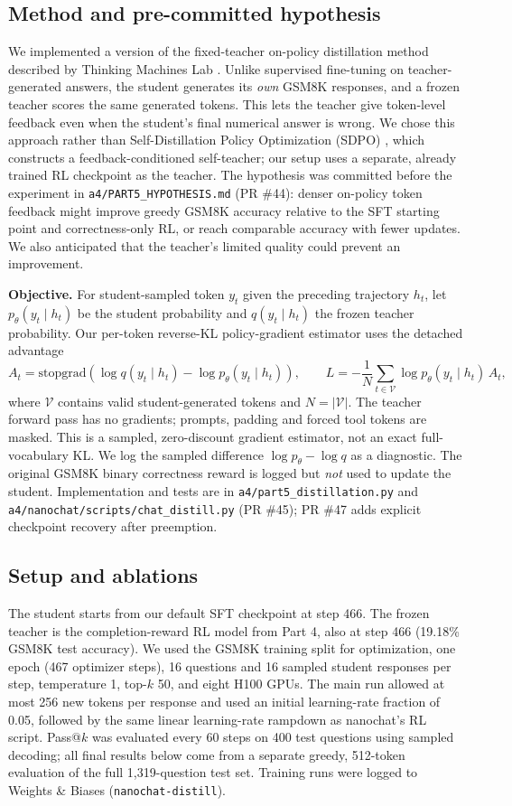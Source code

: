 \documentclass[10pt]{article}
\newcommand{\code}[1]{\texttt{#1}}
\begin{document}
\subsection*{Method and pre-committed hypothesis}
We implemented a version of the fixed-teacher on-policy distillation method described by Thinking Machines Lab \cite{onpolicydistill}. Unlike supervised fine-tuning on teacher-generated answers, the student generates its \emph{own} GSM8K responses, and a frozen teacher scores the same generated tokens. This lets the teacher give token-level feedback even when the student's final numerical answer is wrong. We chose this approach rather than Self-Distillation Policy Optimization (SDPO) \cite{sdpo}, which constructs a feedback-conditioned self-teacher; our setup uses a separate, already trained RL checkpoint as the teacher. The hypothesis was committed before the experiment in \code{a4/PART5\_HYPOTHESIS.md} (PR \#44): denser on-policy token feedback might improve greedy GSM8K accuracy relative to the SFT starting point and correctness-only RL, or reach comparable accuracy with fewer updates. We also anticipated that the teacher's limited quality could prevent an improvement.

\textbf{Objective.} For student-sampled token $y_t$ given the preceding trajectory $h_t$, let $p_\theta(y_t\mid h_t)$ be the student probability and $q(y_t\mid h_t)$ the frozen teacher probability. Our per-token reverse-KL policy-gradient estimator uses the detached advantage
\[
A_t=\mathrm{stopgrad}\!\left(\log q(y_t\mid h_t)-\log p_\theta(y_t\mid h_t)\right),
\qquad
L=-\frac{1}{N}\sum_{t\in\mathcal V}\log p_\theta(y_t\mid h_t)\,A_t,
\]
where $\mathcal V$ contains valid student-generated tokens and $N=|\mathcal V|$. The teacher forward pass has no gradients; prompts, padding and forced tool tokens are masked. This is a sampled, zero-discount gradient estimator, not an exact full-vocabulary KL. We log the sampled difference $\log p_\theta-\log q$ as a diagnostic. The original GSM8K binary correctness reward is logged but \emph{not} used to update the student. Implementation and tests are in \code{a4/part5\_distillation.py} and \code{a4/nanochat/scripts/chat\_distill.py} (PR \#45); PR \#47 adds explicit checkpoint recovery after preemption.

\subsection*{Setup and ablations}
The student starts from our default SFT checkpoint at step 466. The frozen teacher is the completion-reward RL model from Part 4, also at step 466 (19.18\% GSM8K test accuracy). We used the GSM8K training split for optimization, one epoch (467 optimizer steps), 16 questions and 16 sampled student responses per step, temperature 1, top-$k$ 50, and eight H100 GPUs. The main run allowed at most 256 new tokens per response and used an initial learning-rate fraction of 0.05, followed by the same linear learning-rate rampdown as nanochat's RL script. Pass@$k$ was evaluated every 60 steps on 400 test questions using sampled decoding; all final results below come from a separate greedy, 512-token evaluation of the full 1{,}319-question test set. Training runs were logged to Weights \& Biases (\code{nanochat-distill}).
\end{document}
